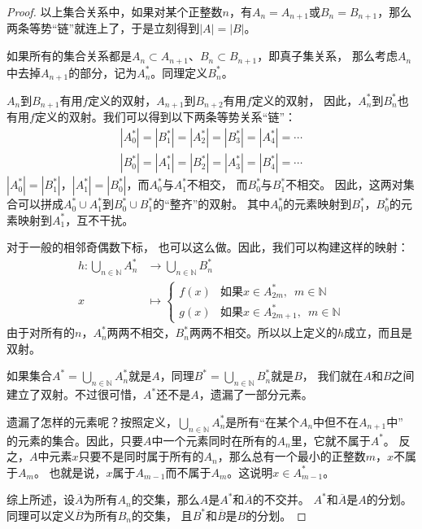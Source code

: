 \documentclass[12pt,UTF8,fontset=none]{ctexbook}
\begin{document}
\begin{appendix}
\begin{proof}
    以上集合关系中，如果对某个正整数$n$，有$A_n = A_{n+1}$或$B_n = B_{n+1}$，那么两条等势“链”就连上了，于是立刻得到$|A| = |B|$。

    如果所有的集合关系都是$A_n \subset A_{n+1}$、$B_n \subset B_{n+1}$，即真子集关系，
    那么考虑$A_n$中去掉$A_{n+1}$的部分，记为$A_n^*$。同理定义$B_n^*$。
    
    $A_n$到$B_{n+1}$有用$f$定义的双射，$A_{n+1}$到$B_{n+2}$有用$f$定义的双射，
    因此，$A_n^*$到$B_n^*$也有用$f$定义的双射。我们可以得到以下两条等势关系“链”：
    \begin{align*}
        |A_0^*| = |B_1^*| = |A_2^*| = |B_3^*| = |A_4^*| = \cdots  \\
        |B_0^*| = |A_1^*| = |B_2^*| = |A_3^*| = |B_4^*| = \cdots   
    \end{align*}
    $|A_0^*| = |B_1^*|$，$|A_1^*| = |B_0^*|$，而$A_0^*$与$A_1^*$不相交，
    而$B_0^*$与$B_1^*$不相交。
    因此，这两对集合可以拼成$A_0^* \cup A_1^*$到$B_0^* \cup B_1^*$的“整齐”的双射。
    其中$A_0^*$的元素映射到$B_1^*$，$B_0^*$的元素映射到$A_1^*$，互不干扰。
    
    对于一般的相邻奇偶数下标，
    也可以这么做。因此，我们可以构建这样的映射：
    \begin{align*}
        h : \bigcup_{n\in\mathbb{N}} A_n^* &\rightarrow \bigcup_{n\in\mathbb{N}} B_n^*  \\
        x \quad&\mapsto \left\{ \begin{array}{ll}
            f(x) & \mbox{如果} x\in A_{2m}^*,\,\,\, m\in\mathbb{N}  \\
            g(x) & \mbox{如果} x\in A_{2m+1}^*,\,\,\, m\in\mathbb{N} 
        \end{array} \right.
    \end{align*}
    由于对所有的$n$，$A_n^*$两两不相交，$B_n^*$两两不相交。所以以上定义的$h$成立，而且是双射。

    如果集合$A^* = \bigcup_{n\in\mathbb{N}} A_n^*$就是$A$，同理$B^* = \bigcup_{n\in\mathbb{N}} B_n^*$就是$B$，
    我们就在$A$和$B$之间建立了双射。不过很可惜，$A^*$还不是$A$，遗漏了一部分元素。

    遗漏了怎样的元素呢？按照定义，$\bigcup_{n\in\mathbb{N}} A_n^*$是所有“在某个$A_n$中但不在$A_{n+1}$中”
    的元素的集合。因此，只要$A$中一个元素同时在所有的$A_n$里，它就不属于$A^*$。
    反之，$A$中元素$x$只要不是同时属于所有的$A_n$，那么总有一个最小的正整数$m$，$x$不属于$A_m$。
    也就是说，$x$属于$A_{m-1}$而不属于$A_m$。这说明$x\in A_{m-1}^*$。

    综上所述，设$\overline{A}$为所有$A_n$的交集，那么$A$是$A^*$和$\overline{A}$的不交并。
    $A^*$和$\overline{A}$是$A$的分划。同理可以定义$\overline{B}$为所有$B_n$的交集，
    且$B^*$和$\overline{B}$是$B$的分划。


\end{proof}
\end{appendix}
\end{document}
